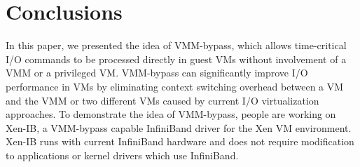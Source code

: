 \documentclass[12pt]{article}
\begin{document}
\vspace{\baselineskip}
\setlength{\parskip}{8.04pt}
\section*{Conclusions}
{\fontsize{13pt}{15.6pt}\selectfont In this paper, we presented the idea of VMM-bypass, which allows time-critical I/O commands to be processed directly in guest VMs without involvement of a VMM or a privileged VM. VMM-bypass can significantly improve I/O performance in VMs by eliminating context switching overhead between a VM and the VMM or two different VMs caused by current I/O virtualization approaches. To demonstrate the idea of VMM-bypass, people are working on Xen-IB, a VMM-bypass capable InfiniBand driver for the Xen VM environment. Xen-IB runs with current InfiniBand hardware and does not require modification to applications or kernel drivers which use InfiniBand.\par}\par


\printbibliography
\end{document}
